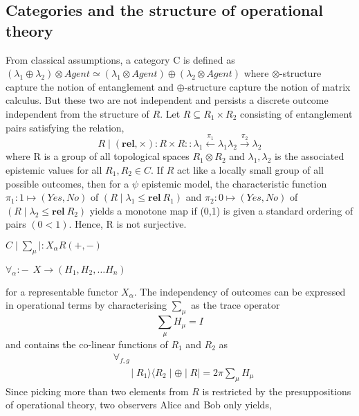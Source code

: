 \documentclass{article}
\begin{document}
 \subsection{Categories and the structure of operational theory}
From classical assumptions, a category C is defined as $(\lambda_1 \oplus \lambda_2) \otimes Agent \simeq (\lambda_1 \otimes Agent ) \oplus (\lambda_2 \otimes Agent) $ where $\otimes$-structure capture the notion of entanglement and $\oplus$-structure capture the notion of matrix calculus. But these two are not independent and persists a discrete outcome independent from the structure of $R$. Let $R \subseteq R_1 \times R_2$ consisting of entanglement pairs satisfying the relation,
\begin{equation}
    R \mid (\boldsymbol{rel} , \times ) : R \times R :: \lambda_1 \xleftarrow{\pi_1} \lambda_1 \lambda_2 \xrightarrow{\pi_2} \lambda_2
\end{equation} where R is a group of all topological spaces $R_1 \otimes R_2$ and $\lambda_1 ,\lambda_2$ is the associated epistemic values for all $R_1 , R_2 \in C$. If $R$ act like a locally small group of all possible outcomes, then for a $\psi$ epistemic model, the characteristic function $\pi_1 : 1 \mapsto (Yes, No)$ of $(R \mid \lambda_1 \leq \boldsymbol{rel} \ R_1 )$ and $\pi_2 : 0 \mapsto (Yes, No)$ of $(R \mid \lambda_2 \leq \boldsymbol{rel} \ R_2)$ yields a monotone map if (0,1) is given a standard ordering of pairs $(0 < 1 )$. Hence, R is not surjective.
\begin{center}
   $ C \mid \sum_\mu \mid : X_{\alpha} R(+, -)$
\end{center}
\begin{center}
 $\forall_{\alpha} :-  \ \ X \longrightarrow(H_1 , H_2 , \dots H_n )$
\end{center} for a representable functor $X_\alpha$. The independency of outcomes can be expressed in operational terms by characterising $\sum_\mu$ as the trace operator 
\begin{equation}
\sum_\mu H_\mu = I
\end{equation} and contains the co-linear functions of $R_1$ and $R_2$ as
\begin{equation}
\begin{split}
&\forall_{f,g} \\
& \ \ \ \ \ \ \ \mid R_1 \rangle \langle R_2 \mid \oplus \mid R \mid =  2 \pi  \sum_\mu H_\mu
\end{split}
\end{equation}  Since picking more than two elements from $R$ is restricted by the presuppositions of operational theory, two observers Alice and Bob only yields,
\end{document}
